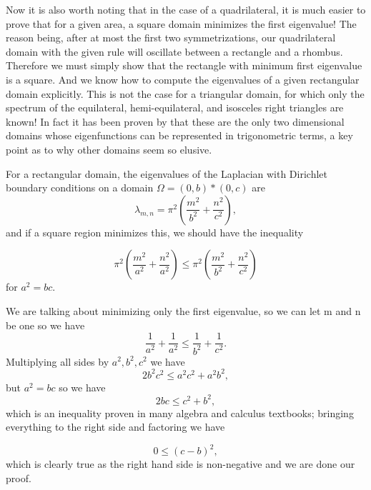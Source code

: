 \documentclass[12pt]{report}
\numberwithin{definition}{section}
\begin{document}
Now it is also worth noting that in the case of a quadrilateral, it is much easier to prove that for a given area, a square domain minimizes the first eigenvalue! The reason being, after at most the first two symmetrizations, our quadrilateral domain with the given rule will oscillate between a rectangle and a rhombus. Therefore we must simply show that the rectangle with minimum first eigenvalue is a square. And we know how to compute the eigenvalues of a given rectangular domain explicitly. This is not the case for a triangular domain, for which only the spectrum of the equilateral, hemi-equilateral, and isosceles right triangles are known! In fact it has been proven by \cite{McCartin} that these are the only two dimensional domains whose eigenfunctions can be represented in trigonometric terms, a key point as to why other domains seem so elusive. 

For a rectangular domain, the eigenvalues of the Laplacian with Dirichlet boundary conditions on a domain $\Omega = (0, b)*(0,c)$ are
\[
\lambda_{m,n}=\pi^2(\frac{m^2}{b^2}+\frac{n^2}{c^2}),
\]
and if a square region minimizes this, we should have the inequality 

\[
\pi^2(\frac{m^2}{a^2}+\frac{n^2}{a^2}) \leq \pi^2(\frac{m^2}{b^2}+\frac{n^2}{c^2})
\]
for $a^2=bc$.

We are talking about minimizing only the first eigenvalue, so we can let m and n be one so we have 
\[
\frac{1}{a^2}+\frac{1}{a^2} \leq \frac{1}{b^2}+\frac{1}{c^2}.
\]
Multiplying all sides by $a^2, b^2, c^2$ we have 
\[
2b^2c^2 \leq a^2c^2+a^2b^2,
\]
but $a^2=bc$ so we have 
\[
2bc \leq c^2+b^2,
\]
which is an inequality proven in many algebra and calculus textbooks; bringing everything to the right side and factoring we have 

\[
0 \leq (c-b)^2,
\]
which is clearly true as the right hand side is non-negative and we are done our proof. 
\end{document}
